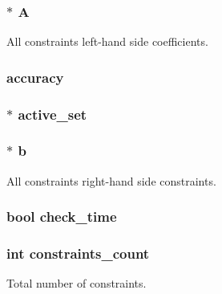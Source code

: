\subsubsection[{A}]{$\ast$ A}\label{structproblem_ac56453eb618f2ce98f20d91442a5690b}
All constraints left-\/hand side coefficients. \hypertarget{structproblem_abb02aa4aa436e037d8c806b2364cf97c}{}
\subsubsection[{accuracy}]{ accuracy}\label{structproblem_abb02aa4aa436e037d8c806b2364cf97c}
\hypertarget{structproblem_a27b8b36dc36cb3620e52c6275d0bb87b}{}
\subsubsection[{active\+\_\+set}]{$\ast$ active\+\_\+set}\label{structproblem_a27b8b36dc36cb3620e52c6275d0bb87b}
\hypertarget{structproblem_a844487a6c95b5fd7a6c768f5fdaa24c0}{}
\subsubsection[{b}]{$\ast$ b}\label{structproblem_a844487a6c95b5fd7a6c768f5fdaa24c0}
All constraints right-\/hand side constraints. \hypertarget{structproblem_afb90fd1d52b36f4f03af3b09f7679bd8}{}
\subsubsection[{check\+\_\+time}]{\setlength{\rightskip}{0pt plus 5cm}bool check\+\_\+time}\label{structproblem_afb90fd1d52b36f4f03af3b09f7679bd8}
\hypertarget{structproblem_af4bd8be9dbe65720b067dc893e57481a}{}
\subsubsection[{constraints\+\_\+count}]{\setlength{\rightskip}{0pt plus 5cm}int constraints\+\_\+count}\label{structproblem_af4bd8be9dbe65720b067dc893e57481a}
Total number of constraints. \hypertarget{structproblem_a1fc7c4b0ad7cae12ae26a243648cec36}{}
